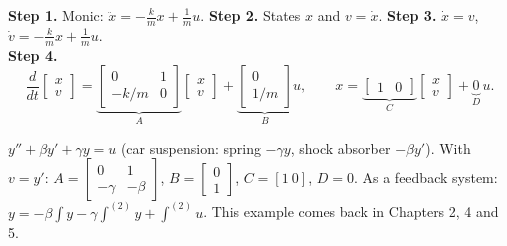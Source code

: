 \begin{workbox}[title={Worked example (AE1, A1.3): simple harmonic oscillator $m\ddot x+kx=u$}]
\textbf{Step 1.} Monic: $\ddot x=-\frac km x+\frac1m u$.\quad
\textbf{Step 2.} States $x$ and $v=\dot x$.\quad
\textbf{Step 3.} $\dot x=v$, $\dot v=-\frac km x+\frac1m u$.\\
\textbf{Step 4.}
\[
\frac{d}{dt}\begin{bmatrix}x\\v\end{bmatrix}=\underbrace{\begin{bmatrix}0&1\\-k/m&0\end{bmatrix}}_{A}\begin{bmatrix}x\\v\end{bmatrix}+\underbrace{\begin{bmatrix}0\\1/m\end{bmatrix}}_{B}u,\qquad
x=\underbrace{\begin{bmatrix}1&0\end{bmatrix}}_{C}\begin{bmatrix}x\\v\end{bmatrix}+\underbrace{0}_{D}\,u.
\]
\end{workbox}

\begin{workbox}[title={Worked example: damped harmonic oscillator \fr{23--25}}]
$y''+\beta y'+\gamma y=u$ (car suspension: spring $-\gamma y$, shock absorber $-\beta y'$). With $v=y'$:
$A=\begin{bmatrix}0&1\\-\gamma&-\beta\end{bmatrix}$, $B=\begin{bmatrix}0\\1\end{bmatrix}$, $C=[1\ 0]$, $D=0$.
As a feedback system: $y=-\beta\int y-\gamma\int^{(2)}y+\int^{(2)}u$. This example comes back in Chapters 2, 4 and 5.
\end{workbox}

